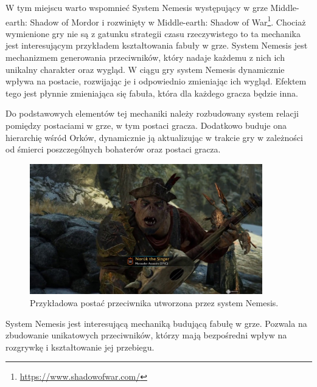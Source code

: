 W tym miejscu warto wspomnieć System Nemesis występujący w grze Middle-earth: Shadow of Mordor i rozwinięty w
Middle-earth: Shadow of War\footnote{\url{https://www.shadowofwar.com/}}. Chociaż wymienione gry nie są z gatunku strategii czasu rzeczywistego to ta mechanika jest
interesującym przykładem kształtowania fabuły w grze. System Nemesis jest mechanizmem generowania przeciwników, który nadaje
każdemu z nich ich unikalny charakter oraz wygląd. W ciągu gry system Nemesis dynamicznie wpływa na postacie, rozwijając
je i odpowiednio zmieniając ich wygląd. Efektem tego jest płynnie zmieniająca się fabuła, która dla każdego gracza
będzie inna.

Do podstawowych elementów tej mechaniki należy rozbudowany system relacji pomiędzy postaciami w grze, w tym postaci
gracza. Dodatkowo buduje ona hierarchię wśród Orków, dynamicznie ją aktualizując w trakcie gry w zależności od śmierci
poszczególnych bohaterów oraz postaci gracza.

\begin{figure}[h!]
    \centering
    \includegraphics[width=0.9\textwidth]{images/system_nemesis.jpg}
    \caption{Przykładowa postać przeciwnika utworzona przez system Nemesis.}
\end{figure}

System Nemesis jest interesującą mechaniką budującą fabułę w grze. Pozwala na zbudowanie unikatowych przeciwników,
którzy mają bezpośredni wpływ na rozgrywkę i kształtowanie jej przebiegu.